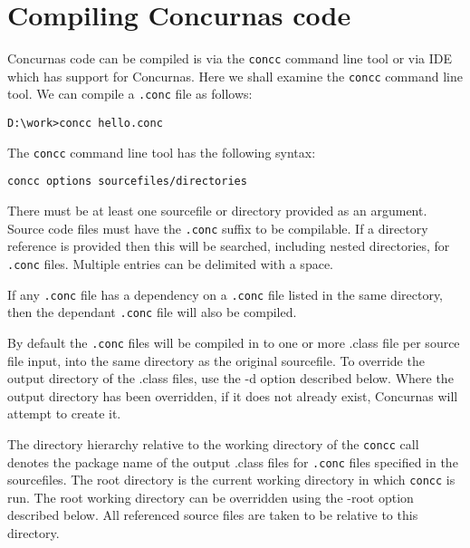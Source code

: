 \documentclass[conc-doc]{subfiles}
\begin{document}
	\chapter[Compiling Concurnas code]{Compiling Concurnas code}
	\label{ch:concc}
	

Concurnas code can be compiled is via the \lstinline[language=None]{concc} command line tool or via IDE which has support for Concurnas. Here we shall examine the \lstinline[language=None]{concc} command line tool. We can compile a \lstinline[language=None]{.conc} file as follows:

\begin{lstlisting}[language=None]
D:\work>concc hello.conc
\end{lstlisting}

The \lstinline[language=None]{concc} command line tool has the following syntax:

\begin{center}
\lstinline[language=None]{concc options sourcefiles/directories}
\end{center}

There must be at least one sourcefile or directory provided as an argument. Source code files must have the \lstinline[language=None]{.conc} suffix to be compilable. If a directory reference is provided then this will be searched, including nested directories, for \lstinline[language=None]{.conc} files. Multiple entries can be delimited with a space.

If any \lstinline[language=None]{.conc} file has a dependency on a \lstinline[language=None]{.conc} file listed in the same directory, then the dependant \lstinline[language=None]{.conc} file will also be compiled.

By default the \lstinline[language=None]{.conc} files will be compiled in to one or more .class file per source file input, into the same directory as the original sourcefile. To override the output directory of the .class files, use the -d option described below. Where the output directory has been overridden, if it does not already exist, Concurnas will attempt to create it.

The directory hierarchy relative to the working directory of the \lstinline[language=None]{concc} call denotes the package name of the output .class files for \lstinline[language=None]{.conc} files specified in the sourcefiles. The root directory is the current working directory in which \lstinline[language=None]{concc} is run. The root working directory can be overridden using the -root option described below. All referenced source files are taken to be relative to this directory.
\end{document}
